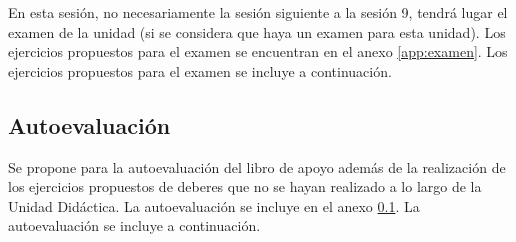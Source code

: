 En esta sesión, no necesariamente la sesión siguiente a la sesión 9, tendrá lugar el examen de la unidad (si se considera que haya un examen para esta unidad).
%
\ifinapp
	Los ejercicios propuestos para el examen se encuentran en el anexo \ref{app:examen}.
\else 
	Los ejercicios propuestos para el examen se incluye a continuación.
	
\fi


\subsection{Autoevaluación}
\label{app:autoeval}

Se propone para la autoevaluación del libro de apoyo \cite[p. 120]{MareaVerde} además de la realización de los ejercicios propuestos de deberes que no se hayan realizado a lo largo de la Unidad Didáctica.
%
\ifinapp
	La autoevaluación se incluye en el anexo \ref{app:autoeval}.
\else 
	La autoevaluación se incluye a continuación.
	
\fi


